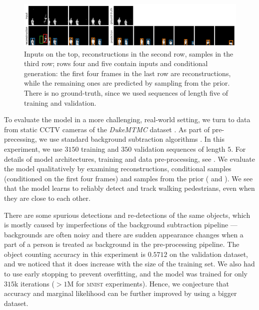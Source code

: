 \begin{figure}
\begin{minipage}[c]{0.49\linewidth}
    \end{minipage}
    \includegraphics[width=.95\linewidth]{figures/SQAIR/duke_cond_gen/front/sqair_duke_cond_after_four}
    \caption{Inputs on the top, reconstructions in the second row, samples in the third row; rows four and five contain inputs and conditional generation: the first four frames in the last row are reconstructions, while the remaining ones are predicted by sampling from the prior. There is no ground-truth, since we used sequences of length five of training and validation.}
    \label{fig:duke_rec}
\end{figure}
To evaluate the model in a more challenging, real-world setting, we turn to data from static CCTV cameras of the \textit{DukeMTMC} dataset \citep{Ristani2016performance}. As part of pre-precessing, we use standard background subtraction algorithms \citep{Itseez2015opencv}. In this experiment, we use $3150$ training and $350$ validation sequences of length $5$. For details of model architectures, training and data pre-processing, see .
We evaluate the model qualitatively by examining reconstructions, conditional samples (conditioned on the first four frames) and samples from the prior ( and ).
We see that the model learns to reliably detect and track walking pedestrians, even when they are close to each other.

There are some spurious detections and re-detections of the same objects, which is mostly caused by imperfections of the background subtraction pipeline --- backgrounds are often noisy and there are sudden appearance changes when a part of a person is treated as background in the pre-processing pipeline.
The object counting accuracy in this experiment is $0.5712$ on the validation dataset, and we noticed that it does increase with the size of the training set. We also had to use early stopping to prevent overfitting, and the model was trained for only $315$k iterations ($>1$M for \textsc{mnist} experiments). Hence, we conjecture that accuracy and marginal likelihood can be further improved by using a bigger dataset.